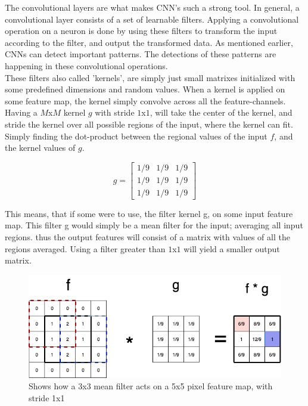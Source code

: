 The convolutional layers are what makes CNN's such a strong tool. In general, a convolutional layer consists of a set of learnable filters. Applying a convolutional operation on a neuron is done by using these filters to transform the input according to the filter, and output the transformed data. As mentioned earlier, CNNs can detect important patterns. The detections of these patterns are happening in these convolutional operations.\\

\noindent
These filters also called 'kernels', are simply just small matrixes initialized with some predefined dimensions and random values. When a kernel is applied on some feature map, the kernel simply convolve across all the feature-channels.\\

\noindent
Having a $M$x$M$ kernel $g$ with stride $1$x$1$, will take the center of the kernel, and stride the kernel over all possible regions of the input, where the kernel can fit. Simply finding the dot-product between the regional values of the input $f$, and the kernel values of $g$.

$$ g = \begin{bmatrix}
1/9 & 1/9 & 1/9 \\
1/9 & 1/9 & 1/9 \\
1/9 & 1/9 & 1/9
\end{bmatrix}
$$

\noindent
This means, that if some were to use, the filter kernel g, on some input feature map. This filter g would simply be a mean filter for the input; averaging all input regions. thus the output features will consist of a matrix with values of all the regions averaged. Using a filter greater than $1$x$1$ will yield a smaller output matrix.

\begin{figure}[!ht]
  \centering
  \includegraphics[scale=0.4]{latex/imgs/conv1.png}
  \caption{Shows how a 3x3 mean filter acts on a 5x5 pixel feature map, with stride 1x1}\label{Baseline:before}
\end{figure}

